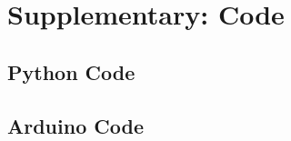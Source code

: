 \documentclass[12pt,a4paper]{article}
\begin{document}
\appendix
\section{Supplementary: Code}
\label{sec:supplementary_code}

\subsection{Python Code}





\subsection{Arduino Code}





\end{document}
